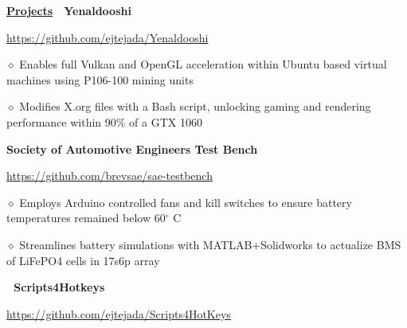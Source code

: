 \documentclass [11pt]{article}
\begin{document}
\begin{flushleft}
\underline{\textbf{Projects}}
\linebreak
%
‭‭%
%
‭‭%
\textbf{Yenaldooshi}\begin{minipage}{0.89 \linewidth}\begin{flushright}\href{https://github.com/ejtejada/Yenaldooshi}{https://github.com/ejtejada/Yenaldooshi}\end{flushright}\end{minipage}

‭‭\quad\quad\quad$\diamond$ Enables full Vulkan and OpenGL acceleration within Ubuntu based virtual machines using P106-100 mining units

‭‭\quad\quad\quad$\diamond$ Modifies X.org files with a Bash script, unlocking gaming and rendering performance within 90\% of a GTX 1060

\textbf{Society of Automotive Engineers Test Bench}\begin{minipage}{0.62 \linewidth}\begin{flushright}\href{https://github.com/brevsae/sae-testbench}{https://github.com/brevsae/sae-testbench}\end{flushright}\end{minipage}

\quad\quad\quad$\diamond$ Employs Arduino controlled fans and kill switches to ensure battery temperatures remained below 60$^{\circ}$ C

‭‭\quad\quad\quad$\diamond$ Streamlines battery simulations with MATLAB+Solidworks to actualize BMS of LiFePO4 cells in 17s6p array

%
‭‭%
%
‭‭%
\textbf{Scripts4Hotkeys}\begin{minipage}{0.86 \linewidth}\begin{flushright}\href{https://github.com/ejtejada/Scripts4HotKeys}{https://github.com/ejtejada/Scripts4HotKeys}\end{flushright}\end{minipage}


\end{flushleft}
\end{document}
